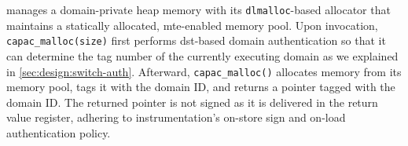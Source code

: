 





\libcapac manages a domain-private heap memory with its \texttt{dlmalloc}-based allocator that maintains a statically allocated, \gls{mte}-enabled memory pool.
Upon invocation, \texttt{capac\_malloc(size)} first performs \gls{dst}-based domain authentication so that it can determine the tag number of the currently executing domain as we explained in \cref{sec:design:switch-auth}.
Afterward, \texttt{capac\_malloc()} allocates memory from its memory pool, tags it with the domain ID, and returns a pointer tagged with the domain ID.
The returned pointer is not signed as it is delivered in the return value register, adhering to \thename instrumentation's on-store sign and on-load authentication policy.

